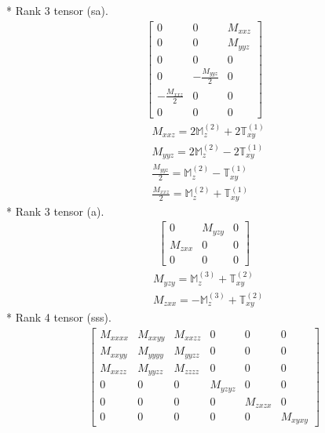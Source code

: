\documentclass[fleqn,8pt,landscape]{jsarticle}
\begin{document}
* Rank 3 tensor (sa).
\begin{align*}
\begin{bmatrix} 0 & 0 & M_{xxz} \\ 0 & 0 & M_{yyz} \\ 0 & 0 & 0 \\ 0 & - \frac{M_{yyz}}{2} & 0 \\ - \frac{M_{xxz}}{2} & 0 & 0 \\ 0 & 0 & 0 \end{bmatrix}
\end{align*}
\begin{align*}
& M_{xxz} = 2 \mathbb{M}_{z}^{(2)} + 2 \mathbb{T}_{xy}^{(1)} \\
& M_{yyz} = 2 \mathbb{M}_{z}^{(2)} - 2 \mathbb{T}_{xy}^{(1)} \\
& \frac{M_{yyz}}{2} = \mathbb{M}_{z}^{(2)} - \mathbb{T}_{xy}^{(1)} \\
& \frac{M_{xxz}}{2} = \mathbb{M}_{z}^{(2)} + \mathbb{T}_{xy}^{(1)}
\end{align*}
* Rank 3 tensor (a).
\begin{align*}
\begin{bmatrix} 0 & M_{yzy} & 0 \\ M_{zxx} & 0 & 0 \\ 0 & 0 & 0 \end{bmatrix}
\end{align*}
\begin{align*}
& M_{yzy} = \mathbb{M}_{z}^{(3)} + \mathbb{T}_{xy}^{(2)} \\
& M_{zxx} = - \mathbb{M}_{z}^{(3)} + \mathbb{T}_{xy}^{(2)}
\end{align*}
* Rank 4 tensor (sss).
\begin{align*}
\begin{bmatrix} M_{xxxx} & M_{xxyy} & M_{xxzz} & 0 & 0 & 0 \\ M_{xxyy} & M_{yyyy} & M_{yyzz} & 0 & 0 & 0 \\ M_{xxzz} & M_{yyzz} & M_{zzzz} & 0 & 0 & 0 \\ 0 & 0 & 0 & M_{yzyz} & 0 & 0 \\ 0 & 0 & 0 & 0 & M_{zxzx} & 0 \\ 0 & 0 & 0 & 0 & 0 & M_{xyxy} \end{bmatrix}
\end{align*}
\end{document}
